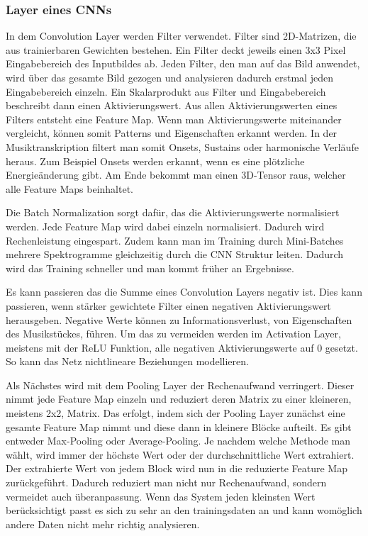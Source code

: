 \subsubsection{Layer eines CNNs}
In dem Convolution Layer werden Filter verwendet.
Filter sind 2D-Matrizen, die aus trainierbaren Gewichten bestehen.
Ein Filter deckt jeweils einen 3x3 Pixel Eingabebereich des Inputbildes ab.
Jeden Filter, den man auf das Bild anwendet,
wird über das gesamte Bild gezogen und analysieren dadurch erstmal jeden Eingabebereich einzeln.
Ein Skalarprodukt aus Filter und Eingabebereich beschreibt dann einen Aktivierungswert.
Aus allen Aktivierungswerten eines Filters entsteht eine Feature Map.
Wenn man Aktivierungswerte miteinander vergleicht,
können somit Patterns und Eigenschaften erkannt werden.
In der Musiktranskription filtert man somit Onsets, Sustains oder harmonische Verläufe heraus.
Zum Beispiel Onsets werden erkannt, wenn es eine plötzliche Energieänderung gibt.
Am Ende bekommt man einen 3D-Tensor raus, welcher alle Feature Maps beinhaltet.

Die Batch Normalization sorgt dafür, das die Aktivierungswerte normalisiert werden.
Jede Feature Map wird dabei einzeln normalisiert.
Dadurch wird Rechenleistung eingespart.
Zudem kann man im Training durch Mini-Batches mehrere Spektrogramme gleichzeitig durch die CNN Struktur leiten.
Dadurch wird das Training schneller und man kommt früher an Ergebnisse.

Es kann passieren das die Summe eines Convolution Layers negativ ist.
Dies kann passieren, wenn stärker gewichtete Filter einen negativen Aktivierungswert herausgeben.
Negative Werte können zu Informationsverlust, von Eigenschaften des Musikstückes, führen.
Um das zu vermeiden werden im Activation Layer, meistens mit der ReLU Funktion,
alle negativen Aktivierungswerte auf 0 gesetzt.
So kann das Netz nichtlineare Beziehungen modellieren.

Als Nächstes wird mit dem Pooling Layer der Rechenaufwand verringert.
Dieser nimmt jede Feature Map einzeln und reduziert deren Matrix zu einer kleineren, meistens 2x2, Matrix.
Das erfolgt, indem sich der Pooling Layer zunächst eine
gesamte Feature Map nimmt und diese dann in kleinere Blöcke aufteilt.
Es gibt entweder Max-Pooling oder Average-Pooling.
Je nachdem welche Methode man wählt, wird immer der höchste Wert oder der durchschnittliche Wert extrahiert.
Der extrahierte Wert von jedem Block wird nun in die reduzierte Feature Map zurückgeführt.
Dadurch reduziert man nicht nur Rechenaufwand, sondern vermeidet auch überanpassung.
Wenn das System jeden kleinsten Wert berücksichtigt passt es sich zu sehr an den trainingsdaten an
und kann womöglich andere Daten nicht mehr richtig analysieren.

